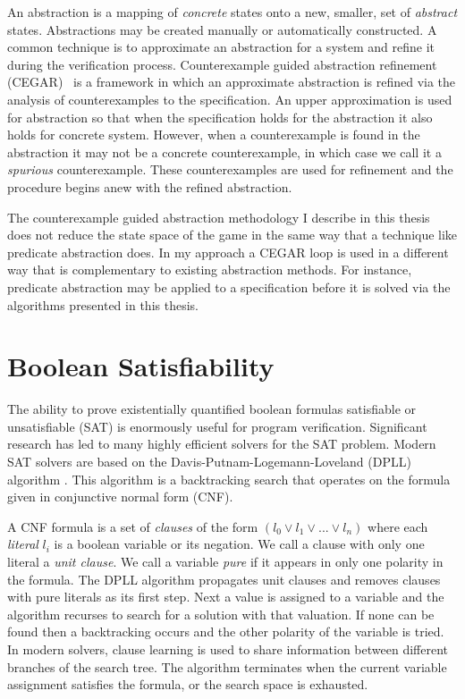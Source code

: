An abstraction is a mapping of \emph{concrete} states onto a new, smaller, set of  \emph{abstract} states. Abstractions may be created manually or automatically constructed. A common technique is to approximate an abstraction for a system and refine it during the verification process. Counterexample guided abstraction refinement (CEGAR)~\cite{Clarke00} is a framework in which an approximate abstraction is refined via the analysis of counterexamples to the specification. An upper approximation is used for abstraction so that when the specification holds for the abstraction it also holds for concrete system. However, when a counterexample is found in the abstraction it may not be a concrete counterexample, in which case we call it a \emph{spurious} counterexample. These counterexamples are used for refinement and the procedure begins anew with the refined abstraction.

The counterexample guided abstraction methodology I describe in this thesis does not reduce the state space of the game in the same way that a technique like predicate abstraction does. In my approach a CEGAR loop is used in a different way that is complementary to existing abstraction methods. For instance, predicate abstraction may be applied to a specification before it is solved via the algorithms presented in this thesis.

\section{Boolean Satisfiability}

The ability to prove existentially quantified boolean formulas satisfiable or
unsatisfiable (SAT) is enormously useful for program verification. Significant
research has led to many highly efficient solvers for the SAT problem. Modern
SAT solvers are based on the Davis-Putnam-Logemann-Loveland (DPLL) algorithm
\cite{Davis60, Davis62}. This algorithm is a backtracking search that operates
on the formula given in conjunctive normal form (CNF).

A CNF formula is a set of \emph{clauses} of the form $(l_0 \lor l_1 \lor ...
\lor l_n)$ where each \emph{literal} $l_i$ is a boolean variable or its
negation. We call a clause with only one literal a \emph{unit clause}. We call
a variable \emph{pure} if it appears in only one polarity in the formula. The
DPLL algorithm propagates unit clauses and removes clauses with pure literals
as its first step. Next a value is assigned to a variable and the algorithm recurses to search for a solution with that valuation. If none can be found then a backtracking occurs and the other polarity of the variable is tried. In modern solvers, clause learning is used to share information between different branches of the search tree. The algorithm terminates when the current variable assignment satisfies the formula, or the search space is exhausted.

